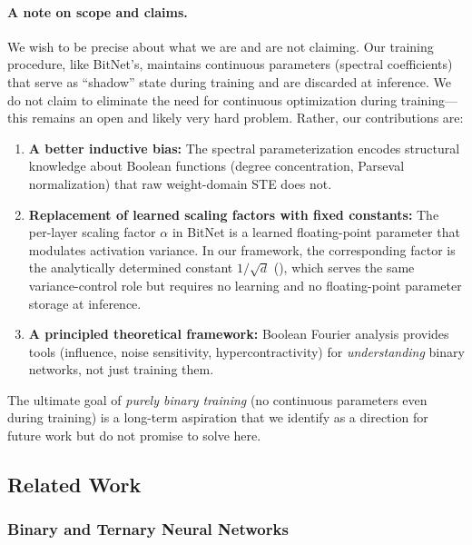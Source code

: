 \documentclass[12pt,a4paper]{article}
\theoremstyle{plain}
\theoremstyle{definition}
\theoremstyle{remark}
\begin{document}
\paragraph{A note on scope and claims.}
We wish to be precise about what we are and are not claiming. Our training procedure, like BitNet's, maintains continuous parameters (spectral coefficients) that serve as ``shadow'' state during training and are discarded at inference. We do not claim to eliminate the need for continuous optimization during training---this remains an open and likely very hard problem. Rather, our contributions are:
\begin{enumerate}[label=(\roman*)]
    \item \textbf{A better inductive bias:} The spectral parameterization encodes structural knowledge about Boolean functions (degree concentration, Parseval normalization) that raw weight-domain STE does not.
    \item \textbf{Replacement of learned scaling factors with fixed constants:} The per-layer scaling factor $\alpha$ in BitNet is a learned floating-point parameter that modulates activation variance. In our framework, the corresponding factor is the analytically determined constant $1/\sqrt{d}$ (), which serves the same variance-control role but requires no learning and no floating-point parameter storage at inference.
    \item \textbf{A principled theoretical framework:} Boolean Fourier analysis provides tools (influence, noise sensitivity, hypercontractivity) for \emph{understanding} binary networks, not just training them.
\end{enumerate}
The ultimate goal of \emph{purely binary training} (no continuous parameters even during training) is a long-term aspiration that we identify as a direction for future work but do not promise to solve here.


\subsection{Related Work}\label{sec:related}

\subsubsection{Binary and Ternary Neural Networks}
\end{document}

